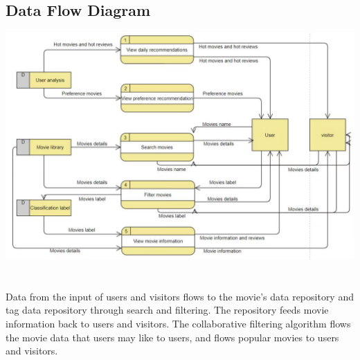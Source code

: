 \documentclass[12pt]{article}
\begin{document}
\subsection{Data Flow Diagram}
\vspace{1cm}
\includegraphics[width=1\linewidth]{DATA.jpg}\\\\\\
Data from the input of users and visitors flows to the movie's data repository and tag data repository through search and filtering. The repository feeds movie information back to users and visitors. The collaborative filtering algorithm flows the movie data that users may like to users, and flows popular movies to users and visitors.\\\newpage
\end{document}
